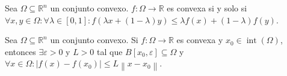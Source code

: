 \begin{definition}
  Sea $\Omega\subseteq\mathbb{R}^{n}$ un conjunto convexo.
  $f\colon\Omega\to\mathbb{R}$ es convexa si y solo si
  \begin{math}
    \forall x,y\in\Omega:\forall\lambda\in\left[0,1\right]:
    f\left(\lambda x+\left(1-\lambda\right)y\right)\leq \lambda
    f\left(x\right)+\left(1-\lambda\right)f\left(y\right)
  \end{math}.
\end{definition}

\begin{theorem}
  Sea $\Omega\subseteq\mathbb{R}^{n}$ un conjunto convexo.
  Si $f\colon\Omega\to\mathbb{R}$ es convexa y
  $x_{0}\in\operatorname{int}\left(\Omega\right)$,
  entonces $\exists\varepsilon>0$ y $L>0$ tal que
  $B\left[x_{0},\varepsilon\right]\subseteq\Omega$ y
  \begin{math}
    \forall x\in\Omega:
    \left|f\left(x\right)-f\left(x_{0}\right)\right|\leq L\left\|x-x_{0}\right\|
  \end{math}.
\end{theorem}
